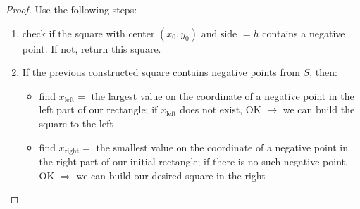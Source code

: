 \documentclass{article}
\newcommand{\<}{\langle}
\renewcommand{\>}{\rangle}
\theoremstyle{definition}
\newcommand{\ra}{\rightarrow}
\begin{document}
\begin{proof}

Use the following steps:
\begin{enumerate}
  \item check if the square with center $(x_0, y_0)$ and side $= h$ contains a negative
    point. If not, return this square.
  \item If the previous constructed square contains negative points from $S$, then:
  \begin{itemize}[label=-]
    \item find $x_{\text{left}} =$ the largest value on the  coordinate of a
      negative point in the left part of our rectangle; if $x_{\text{left}}$ does not
      exist, OK \checkmark $\ra$ we can build the square to the left
    \item find $x_{\text{right}} =$ the smallest value on the  coordinate of a
      negative point in the right part of our initial rectangle; if there is no such
      negative point, OK $\Rightarrow$ we can build our desired square in the right
  \end{itemize}
\end{enumerate}


\end{proof}
\end{document}
